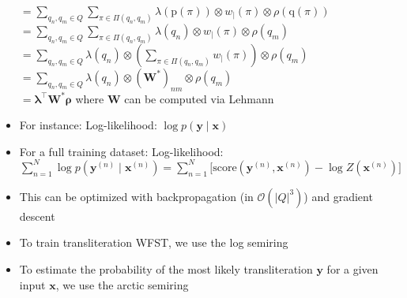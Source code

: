 \begin{itemize}
    $
    = \sum_{q_n, q_m \in Q} \sum_{\pi \in \Pi(q_n, q_m)} \lambda(\textrm{p}(\pi)) \otimes w_\mid(\pi) \otimes \rho(\textrm{q}(\pi))
    $\\
    $
    = \sum_{q_n, q_m \in Q} \sum_{\pi \in \Pi(q_n, q_m)} \lambda(q_n) \otimes w_\mid(\pi) \otimes \rho(q_m)
    $\\
    $
    = \sum_{q_n, q_m \in Q} \lambda(q_n) \otimes (\sum_{\pi \in \Pi(q_n, q_m)} w_\mid(\pi)) \otimes \rho(q_m)
    $\\
    $
    = \sum_{q_n, q_m \in Q} \lambda(q_n) \otimes (\boldsymbol{W}^*)_{nm} \otimes \rho(q_m)
    $\\
    $
    = \boldsymbol{\lambda}^\intercal \boldsymbol{W}^* \boldsymbol{\rho}
    $ where $\boldsymbol{W}$ can be computed via Lehmann
    \item For instance: Log-likelihood: $\log p(\boldsymbol{y} \mid \boldsymbol{x})$
    \item For a full training dataset: Log-likelihood: $\sum_{n=1}^N \log p(\boldsymbol{y}^{(n)} \mid \boldsymbol{x}^{(n)}) = \sum_{n=1}^N \Big[ \textrm{score}(\boldsymbol{y}^{(n)}, \boldsymbol{x}^{(n)}) - \log Z(\boldsymbol{x}^{(n)}) \Big]$
    \item This can be optimized with backpropagation (in $\mathcal{O}(|Q|^3)$) and gradient descent
    \item To train transliteration WFST, we use the log semiring
    \item To estimate the probability of the most likely transliteration $\boldsymbol{y}$ for a given input $\boldsymbol{x}$, we use the arctic semiring
\end{itemize}